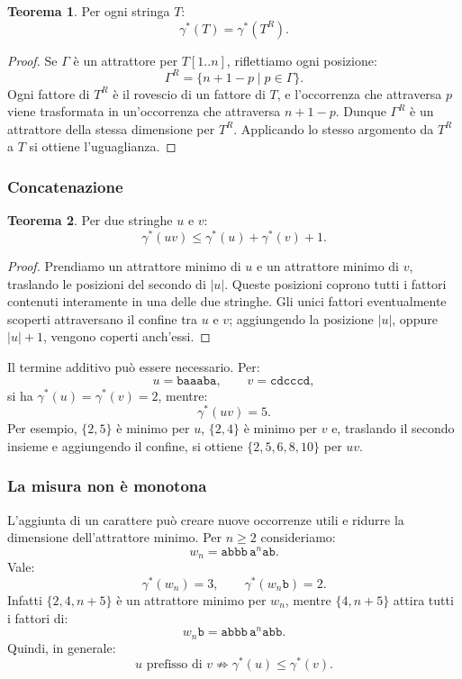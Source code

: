 \documentclass{article}
\theoremstyle{definition}
\newtheorem{theorem}{Teorema}[section] %
\numberwithin{equation}{section}
\begin{document}
\begin{theorem}\label{theorem_attractor_reversal}
    Per ogni stringa $T$:
    \[
        \gamma^*(T)=\gamma^*(T^R).
    \]
\end{theorem}

\begin{proof}
    Se $\Gamma$ è un attrattore per $T[1..n]$, riflettiamo ogni posizione:
    \[
        \Gamma^R=\{n+1-p\mid p\in\Gamma\}.
    \]
    Ogni fattore di $T^R$ è il rovescio di un fattore di $T$, e l'occorrenza che
    attraversa $p$ viene trasformata in un'occorrenza che attraversa
    $n+1-p$. Dunque $\Gamma^R$ è un attrattore della stessa dimensione per
    $T^R$. Applicando lo stesso argomento da $T^R$ a $T$ si ottiene
    l'uguaglianza.
\end{proof}

\subsubsection{Concatenazione}
\begin{theorem}\label{theorem_attractor_concatenation}
    Per due stringhe $u$ e $v$:
    \begin{equation}\label{eq:attractor_concatenation}
        \gamma^*(uv)
        \leq
        \gamma^*(u)+\gamma^*(v)+1.
    \end{equation}
\end{theorem}

\begin{proof}
    Prendiamo un attrattore minimo di $u$ e un attrattore minimo di $v$,
    traslando le posizioni del secondo di $|u|$. Queste posizioni coprono tutti
    i fattori contenuti interamente in una delle due stringhe. Gli unici fattori
    eventualmente scoperti attraversano il confine tra $u$ e $v$; aggiungendo
    la posizione $|u|$, oppure $|u|+1$, vengono coperti anch'essi.
\end{proof}

Il termine additivo può essere necessario. Per:
\[
    u=\texttt{baaaba},
    \qquad
    v=\texttt{cdcccd},
\]
si ha $\gamma^*(u)=\gamma^*(v)=2$, mentre:
\[
    \gamma^*(uv)=5.
\]
Per esempio, $\{2,5\}$ è minimo per $u$, $\{2,4\}$ è minimo per $v$ e,
traslando il secondo insieme e aggiungendo il confine, si ottiene
$\{2,5,6,8,10\}$ per $uv$.

\subsubsection{La misura non è monotona}
L'aggiunta di un carattere può creare nuove occorrenze utili e ridurre la
dimensione dell'attrattore minimo. Per $n\geq 2$ consideriamo:
\[
    w_n=\texttt{abbb}\,\texttt{a}^n\texttt{ab}.
\]
Vale:
\[
    \gamma^*(w_n)=3,
    \qquad
    \gamma^*(w_n\texttt{b})=2.
\]
Infatti $\{2,4,n+5\}$ è un attrattore minimo per $w_n$, mentre
$\{4,n+5\}$ attira tutti i fattori di:
\[
    w_n\texttt{b}
    =
    \texttt{abbb}\,\texttt{a}^n\texttt{abb}.
\]
Quindi, in generale:
\[
    u\text{ prefisso di }v
    \nRightarrow
    \gamma^*(u)\leq\gamma^*(v).
\]
\end{document}
